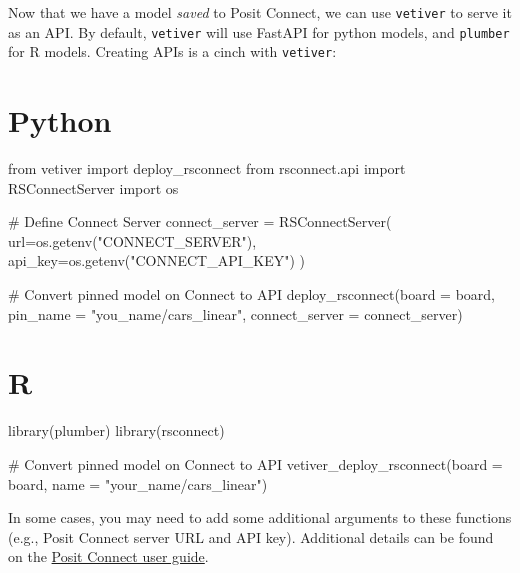 \documentclass[
  letterpaper,
  DIV=11,
  numbers=noendperiod]{scrreprt}
\newenvironment{Shaded}{\begin{snugshade}}{\end{snugshade}}
\newcommand{\AttributeTok}[1]{\textcolor[rgb]{0.40,0.45,0.13}{#1}}
\newcommand{\CommentTok}[1]{\textcolor[rgb]{0.37,0.37,0.37}{#1}}
\newcommand{\FunctionTok}[1]{\textcolor[rgb]{0.28,0.35,0.67}{#1}}
\newcommand{\ImportTok}[1]{\textcolor[rgb]{0.00,0.46,0.62}{#1}}
\newcommand{\NormalTok}[1]{\textcolor[rgb]{0.00,0.23,0.31}{#1}}
\newcommand{\OperatorTok}[1]{\textcolor[rgb]{0.37,0.37,0.37}{#1}}
\newcommand{\StringTok}[1]{\textcolor[rgb]{0.13,0.47,0.30}{#1}}
\begin{document}
Now that we have a model \emph{saved} to Posit Connect, we can use
\texttt{vetiver} to serve it as an API. By default, \texttt{vetiver}
will use FastAPI for python models, and \texttt{plumber} for R models.
Creating APIs is a cinch with \texttt{vetiver}:

\section{Python}

\begin{Shaded}
\begin{Highlighting}[]
\ImportTok{from}\NormalTok{ vetiver }\ImportTok{import}\NormalTok{ deploy\_rsconnect}
\ImportTok{from}\NormalTok{ rsconnect.api }\ImportTok{import}\NormalTok{ RSConnectServer}
\ImportTok{import}\NormalTok{ os}

\CommentTok{\# Define Connect Server}
\NormalTok{connect\_server }\OperatorTok{=}\NormalTok{ RSConnectServer(}
\NormalTok{    url}\OperatorTok{=}\NormalTok{os.getenv(}\StringTok{"CONNECT\_SERVER"}\NormalTok{), }
\NormalTok{    api\_key}\OperatorTok{=}\NormalTok{os.getenv(}\StringTok{"CONNECT\_API\_KEY"}\NormalTok{)}
\NormalTok{)}

\CommentTok{\# Convert pinned model on Connect to API}
\NormalTok{deploy\_rsconnect(board }\OperatorTok{=}\NormalTok{ board, }
\NormalTok{                 pin\_name }\OperatorTok{=} \StringTok{"you\_name/cars\_linear"}\NormalTok{, }
\NormalTok{                 connect\_server }\OperatorTok{=}\NormalTok{ connect\_server)}
\end{Highlighting}
\end{Shaded}

\section{R}

\begin{Shaded}
\begin{Highlighting}[]
\FunctionTok{library}\NormalTok{(plumber)}
\FunctionTok{library}\NormalTok{(rsconnect)}

\CommentTok{\# Convert pinned model on Connect to API}
\FunctionTok{vetiver\_deploy\_rsconnect}\NormalTok{(}\AttributeTok{board =}\NormalTok{ board, }
                         \AttributeTok{name =} \StringTok{"your\_name/cars\_linear"}\NormalTok{)}
\end{Highlighting}
\end{Shaded}

In some cases, you may need to add some additional arguments to these
functions (e.g., Posit Connect server URL and API key). Additional
details can be found on the
\href{https://docs.posit.co/connect/user/vetiver/}{Posit Connect user
guide}.
\end{document}
